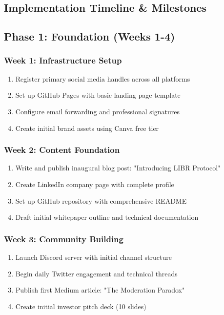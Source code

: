 \documentclass[12pt,a4paper]{article}
\begin{document}
\begin{itemize}
\section{Implementation Timeline \& Milestones}

\subsection{Phase 1: Foundation (Weeks 1-4)}

\subsubsection{Week 1: Infrastructure Setup}
\begin{enumerate}
    \item Register primary social media handles across all platforms
    \item Set up GitHub Pages with basic landing page template
    \item Configure email forwarding and professional signatures
    \item Create initial brand assets using Canva free tier
\end{enumerate}

\subsubsection{Week 2: Content Foundation}
\begin{enumerate}
    \item Write and publish inaugural blog post: "Introducing LIBR Protocol"
    \item Create LinkedIn company page with complete profile
    \item Set up GitHub repository with comprehensive README
    \item Draft initial whitepaper outline and technical documentation
\end{enumerate}

\subsubsection{Week 3: Community Building}
\begin{enumerate}
    \item Launch Discord server with initial channel structure  
    \item Begin daily Twitter engagement and technical threads
    \item Publish first Medium article: "The Moderation Paradox"
    \item Create initial investor pitch deck (10 slides)
\end{enumerate}


\end{itemize}
\end{document}
